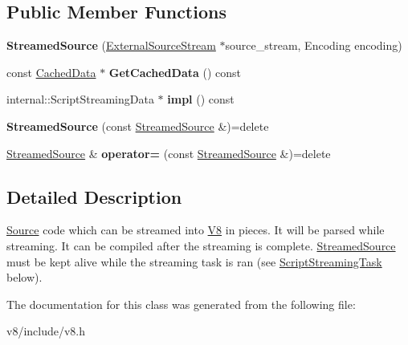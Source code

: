 \subsection*{Public Member Functions}
\begin{DoxyCompactItemize}
\item 
\mbox{\label{classv8_1_1ScriptCompiler_1_1StreamedSource_a4da404a49e48a12927c743797833d8aa}} 
{\bfseries Streamed\+Source} (\mbox{\hyperlink{classv8_1_1ScriptCompiler_1_1ExternalSourceStream}{External\+Source\+Stream}} $\ast$source\+\_\+stream, Encoding encoding)
\item 
\mbox{\label{classv8_1_1ScriptCompiler_1_1StreamedSource_ae85255c03008c888bca870f48b113d82}} 
const \mbox{\hyperlink{structv8_1_1ScriptCompiler_1_1CachedData}{Cached\+Data}} $\ast$ {\bfseries Get\+Cached\+Data} () const
\item 
\mbox{\label{classv8_1_1ScriptCompiler_1_1StreamedSource_a45714bf012e619379d70707b535c8224}} 
internal\+::\+Script\+Streaming\+Data $\ast$ {\bfseries impl} () const
\item 
\mbox{\label{classv8_1_1ScriptCompiler_1_1StreamedSource_ac0024da49305c2d8de1a61348c1c8880}} 
{\bfseries Streamed\+Source} (const \mbox{\hyperlink{classv8_1_1ScriptCompiler_1_1StreamedSource}{Streamed\+Source}} \&)=delete
\item 
\mbox{\label{classv8_1_1ScriptCompiler_1_1StreamedSource_ab2425dcd427fcdfaf6ac0d0cd295bcbb}} 
\mbox{\hyperlink{classv8_1_1ScriptCompiler_1_1StreamedSource}{Streamed\+Source}} \& {\bfseries operator=} (const \mbox{\hyperlink{classv8_1_1ScriptCompiler_1_1StreamedSource}{Streamed\+Source}} \&)=delete
\end{DoxyCompactItemize}


\subsection{Detailed Description}
\mbox{\hyperlink{classv8_1_1ScriptCompiler_1_1Source}{Source}} code which can be streamed into \mbox{\hyperlink{classv8_1_1V8}{V8}} in pieces. It will be parsed while streaming. It can be compiled after the streaming is complete. \mbox{\hyperlink{classv8_1_1ScriptCompiler_1_1StreamedSource}{Streamed\+Source}} must be kept alive while the streaming task is ran (see \mbox{\hyperlink{classv8_1_1ScriptCompiler_1_1ScriptStreamingTask}{Script\+Streaming\+Task}} below). 

The documentation for this class was generated from the following file\+:\begin{DoxyCompactItemize}
\item 
v8/include/v8.\+h\end{DoxyCompactItemize}
